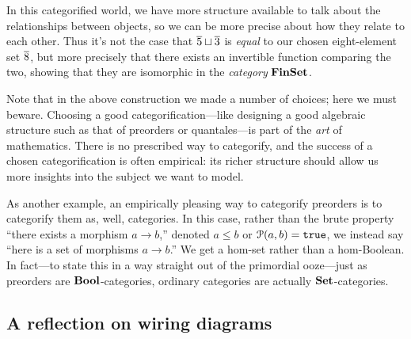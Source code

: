 \documentclass[7Sketches]{subfiles}
\begin{document}
In this categorified world, we have more structure available to talk about the
relationships between objects, so we can be more precise about how they relate
to each other. Thus it's not the case that $\overline{5} \sqcup \overline{3}$ is
\emph{equal} to our chosen eight-element set $\overline{8}$, but more precisely that
there exists an invertible function comparing the two, showing that they are
isomorphic in the \emph{category} $\mathbf{FinSet}$.

Note that in the above construction we made a number of choices; here we must
beware. Choosing a good categorification---like designing a good algebraic
structure such as that of preorders or quantales---is part of the \emph{art} of
mathematics.  There is no prescribed way to categorify, and the success of a
chosen categorification is often empirical: its richer structure should allow us more
insights into the subject we want to model.

As another example, an empirically pleasing way to categorify preorders is to
categorify them as, well, categories.  In this case, rather than the brute
property ``there exists a morphism $a\to b$,'' denoted $a\leq b$ or
$\mathcal{P}(a,b)=\mathtt{true}$, we instead say ``here is a set of morphisms $a\to b$.'' We
get a hom-set rather than a hom-Boolean. In fact---to state this in a way
straight out of the primordial ooze---just as preorders are $\mathbf{Bool}$-categories,
ordinary categories are actually $\mathbf{Set}$-categories.
%

%

\subsection{A reflection on wiring diagrams}%
\label{subsec.reflection_wds}%
\end{document}
